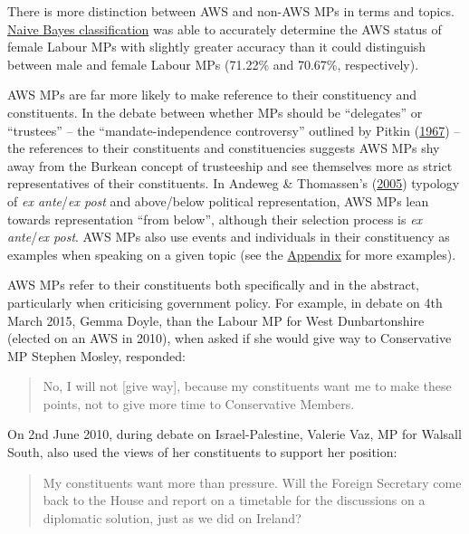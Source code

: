 \documentclass[]{article}
\theoremstyle{definition}
\theoremstyle{definition}
\theoremstyle{definition}
\theoremstyle{remark}
\begin{document}
There is more distinction between AWS and non-AWS MPs in terms and
topics.
\protect\hyperlink{ux5cux2520Naiveux5cux2520Bayesux5cux2520classification}{Naive
Bayes classification} was able to accurately determine the AWS status of
female Labour MPs with slightly greater accuracy than it could
distinguish between male and female Labour MPs (71.22\% and 70.67\%,
respectively).

AWS MPs are far more likely to make reference to their constituency and
constituents. In the debate between whether MPs should be ``delegates''
or ``trustees'' -- the ``mandate-independence controversy'' outlined by
Pitkin (\protect\hyperlink{ref-pitkin1967}{1967}) -- the references to
their constituents and constituencies suggests AWS MPs shy away from the
Burkean concept of trusteeship and see themselves more as strict
representatives of their constituents. In Andeweg \& Thomassen's
(\protect\hyperlink{ref-andeweg2005}{2005}) typology of \emph{ex
ante}/\emph{ex post} and above/below political representation, AWS MPs
lean towards representation ``from below'', although their selection
process is \emph{ex ante}/\emph{ex post}. AWS MPs also use events and
individuals in their constituency as examples when speaking on a given
topic (see the
\protect\hyperlink{ux5cux2520AWSux5cux2520Referencesux5cux2520toux5cux2520Constituentsux5cux2520inux5cux2520Context}{Appendix}
for more examples).

AWS MPs refer to their constituents both specifically and in the
abstract, particularly when criticising government policy. For example,
in debate on 4th March 2015, Gemma Doyle, than the Labour MP for West
Dunbartonshire (elected on an AWS in 2010), when asked if she would give
way to Conservative MP Stephen Mosley, responded:

\begin{quote}
No, I will not {[}give way{]}, because my constituents want me to make
these points, not to give more time to Conservative Members.
\end{quote}

On 2nd June 2010, during debate on Israel-Palestine, Valerie Vaz, MP for
Walsall South, also used the views of her constituents to support her
position:

\begin{quote}
My constituents want more than pressure. Will the Foreign Secretary come
back to the House and report on a timetable for the discussions on a
diplomatic solution, just as we did on Ireland?
\end{quote}
\end{document}
